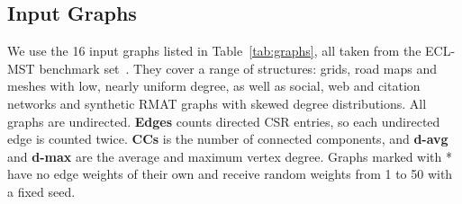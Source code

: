 \documentclass[11pt,a4paper]{article}
\begin{document}
\subsection*{Input Graphs}
We use the 16 input graphs listed in Table~\ref{tab:graphs}, all taken from the ECL-MST benchmark set~\cite{fallin2023eclmst}. They cover a range of structures: grids, road maps and meshes with low, nearly uniform degree, as well as social, web and citation networks and synthetic RMAT graphs with skewed degree distributions. All graphs are undirected. \textbf{Edges} counts directed CSR entries, so each undirected edge is counted twice. \textbf{CCs} is the number of connected components, and \textbf{d-avg} and \textbf{d-max} are the average and maximum vertex degree. Graphs marked with * have no edge weights of their own and receive random weights from 1 to 50 with a fixed seed.
\end{document}
